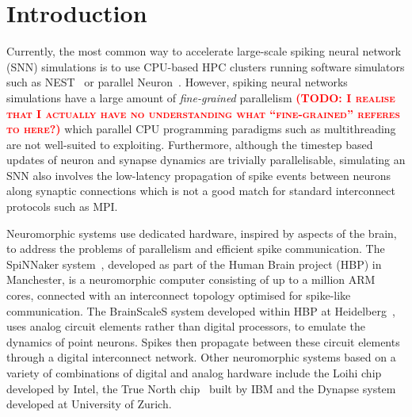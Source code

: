 \documentclass[utf8]{frontiersSCNS} %
\newcommand{\todo}[1]{\textbf{\textsc{\textcolor{red}{(TODO: #1)}}}}
\begin{document}
\section{Introduction}
Currently, the most common way to accelerate large-scale spiking neural network (SNN) simulations is to use CPU-based HPC clusters running software simulators such as NEST~\citep{Gewaltig2007} or parallel Neuron~\citep{carnevale2006neuron}.
However, spiking neural networks simulations have a large amount of \textit{fine-grained} parallelism \todo{I realise that I actually have no understanding what ``fine-grained'' referes to here?} which parallel CPU programming paradigms such as multithreading are not well-suited to exploiting.
Furthermore, although the timestep based updates of neuron and synapse dynamics are trivially parallelisable, simulating an SNN also involves the low-latency propagation of spike events between neurons along synaptic connections which is not a good match for standard interconnect protocols such as MPI.

Neuromorphic systems use dedicated hardware, inspired by aspects of the brain, to address the problems of parallelism and efficient spike communication.
The SpiNNaker system~\citep{Furber2014}, developed as part of the Human Brain project (HBP) in Manchester, is a neuromorphic computer consisting of up to a million ARM cores, connected with an interconnect topology optimised for spike-like communication.
The BrainScaleS system developed within HBP at Heidelberg~\citep{Schemmel2017}, uses analog circuit elements rather than digital processors, to emulate the dynamics of point neurons.
Spikes then propagate between these circuit elements through a digital interconnect network.
Other neuromorphic systems based on a variety of combinations of digital and analog hardware include the Loihi chip~\citep{Davies2018} developed by Intel, the True North chip~\citep{Merolla2014} built by IBM and the Dynapse system~\cite{Qiao2015} developed at University of Zurich.
\end{document}
